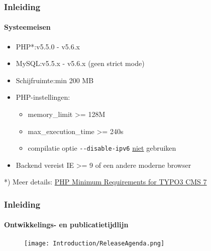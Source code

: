 
\begin{frame}[fragile]
	\frametitle{Inleiding}
	\framesubtitle{Systeemeisen	}

	\begin{itemize}
		\item PHP*:\tabto{2.2cm}v5.5.0 - v5.6.x
		\item MySQL:\tabto{2.2cm}v5.5.x - v5.6.x (geen strict mode)
		\item Schijfruimte:\tabto{2.2cm}min 200 MB
		\item PHP-instellingen:

			\begin{itemize}
				\item memory\_limit >= 128M
				\item max\_execution\_time >= 240s
				\item compilatie optie \texttt{-}\texttt{-disable-ipv6} \underline{niet} gebruiken
			\end{itemize}

		\item Backend vereist IE >= 9 of een andere moderne browser

	\end{itemize}

	\vspace{1cm}
	*) Meer details: \href{http://typo3.org/news/article/php-minimum-requirements-for-typo3-cms-7/}{PHP Minimum Requirements for TYPO3 CMS 7}

\end{frame}


\begin{frame}[fragile]
	\frametitle{Inleiding}
	\framesubtitle{Ontwikkelings- en publicatietijdlijn}

	\begin{figure}
		\texttt{[image: Introduction/ReleaseAgenda.png]}
	\end{figure}

\end{frame}

